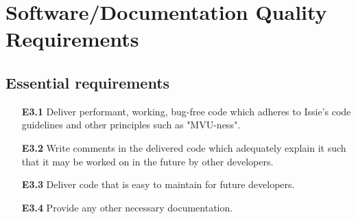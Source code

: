 

\section{Software/Documentation Quality Requirements}
\subsection*{Essential requirements}
\begin{itemize}
    \item[\textbf{E3.1}] Deliver performant, working, bug-free code which adheres to Issie's code guidelines and other principles such as "MVU-ness".
    \medskip
    \item[\textbf{E3.2}] Write comments in the delivered code which adequately explain it such that it may be worked on in the future by other developers. 
    \medskip
    \item[\textbf{E3.3}] Deliver code that is easy to maintain for future developers.
    \medskip
    \item[\textbf{E3.4}] Provide any other necessary documentation.
\end{itemize}

